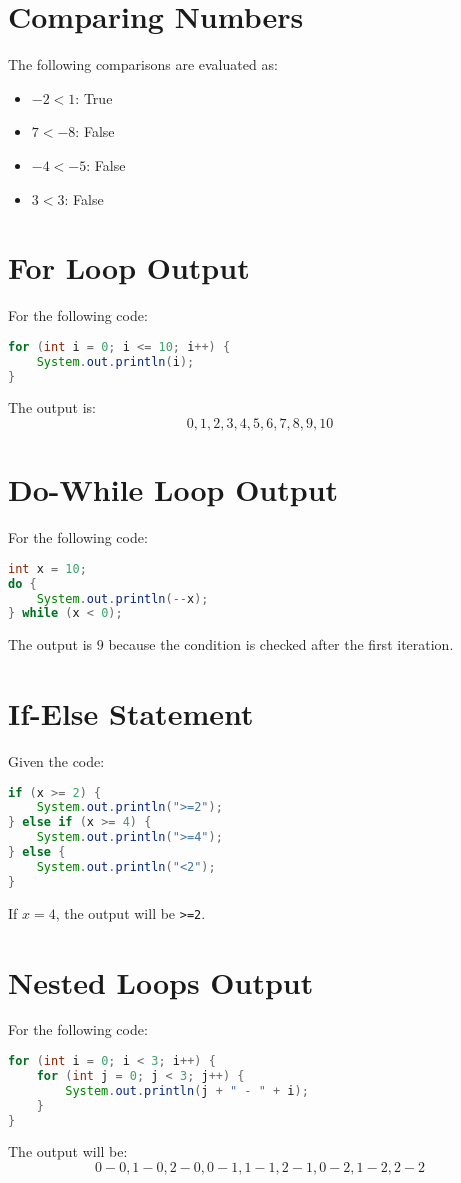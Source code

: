 \documentclass{article}
\begin{document}
\section{Comparing Numbers}
The following comparisons are evaluated as:
\begin{itemize}
    \item $-2 < 1$: True
    \item $7 < -8$: False
    \item $-4 < -5$: False
    \item $3 < 3$: False
\end{itemize}

\section{For Loop Output}
For the following code:
\begin{lstlisting}[language=Java]
for (int i = 0; i <= 10; i++) {
    System.out.println(i);
}
\end{lstlisting}
The output is:
\[
0, 1, 2, 3, 4, 5, 6, 7, 8, 9, 10
\]

\section{Do-While Loop Output}
For the following code:
\begin{lstlisting}[language=Java]
int x = 10;
do {
    System.out.println(--x);
} while (x < 0);
\end{lstlisting}
The output is $9$ because the condition is checked after the first iteration.

\section{If-Else Statement}
Given the code:
\begin{lstlisting}[language=Java]
if (x >= 2) {
    System.out.println(">=2");
} else if (x >= 4) {
    System.out.println(">=4");
} else {
    System.out.println("<2");
}
\end{lstlisting}
If $x = 4$, the output will be \texttt{>=2}.

\section{Nested Loops Output}
For the following code:
\begin{lstlisting}[language=Java]
for (int i = 0; i < 3; i++) {
    for (int j = 0; j < 3; j++) {
        System.out.println(j + " - " + i);
    }
}
\end{lstlisting}
The output will be:
\[
0 - 0, 1 - 0, 2 - 0, 0 - 1, 1 - 1, 2 - 1, 0 - 2, 1 - 2, 2 - 2
\]
\end{document}
